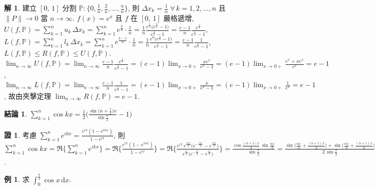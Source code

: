 \documentclass[12pt]{extarticle}
\newcommand{\ds}{\displaystyle}
\theoremstyle{definition}
\newtheorem*{fact}{結論}
\newtheorem*{ex}{例}
\newtheorem*{sol}{解}
\newtheorem*{prf}{證}
\begin{document}
\begin{sol}
  建立 $\ds [0,\,1]$ 分割 $\ds\mathbb{P}: \Big\{0, \frac{1}{n}, \frac{2}{n}, \ldots, \frac{n}{n}\Big\}$, 則 $\ds\Delta x_k = \frac{1}{n}\;\forall\,k=1,2,\ldots,n$ 且 $\ds\|P\|\to 0$ 當 $n\to\infty$. $f(x) = e^x$ 且 $f$ 在 $[0,\,1]$ 嚴格遞增, $\ds U(f,\mathbb{P}) = \sum_{k=1}^n u_k\,\Delta x_k = \sum_{k=1}^n e^{\frac{k}{n}}\cdot\frac{1}{n} = \frac{1}{n}\frac{e^{\frac{1}{n}}\big(e^{\frac{n}{n}} - 1\big)}{e^{\frac{1}{n}} - 1} = \frac{e - 1}{n}\frac{e^{\frac{1}{n}}}{e^{\frac{1}{n}} - 1}$, $\ds L(f,\mathbb{P}) = \sum_{k=1}^n l_k\,\Delta x_k = \sum_{k=1}^n e^{\frac{k - 1}{n}}\cdot\frac{1}{n} = \frac{1}{n}\frac{e^0\big(e^{\frac{n}{n}} - 1\big)}{e^{\frac{1}{n}} - 1} = \frac{e - 1}{n}\frac{1}{e^{\frac{1}{n}} - 1}$, $\ds L(f,\mathbb{P})\leqslant R(f,\mathbb{P})\leqslant U(f, \mathbb{P})$. $\ds\lim_{n\to\infty} U(f,\mathbb{P}) = \lim_{n\to\infty}\frac{e - 1}{n}\frac{e^{\frac{1}{n}}}{e^{\frac{1}{n}} - 1} = (e - 1)\lim_{x\to 0+}\frac{x e^x}{e^x - 1} = (e - 1)\lim_{x\to 0+}\frac{e^x + x e^x}{e^x} = e - 1$, $\ds\lim_{n\to\infty} L(f,\mathbb{P}) = \lim_{n\to\infty}\frac{e - 1}{n}\frac{1}{e^{\frac{1}{n}} - 1} = (e - 1)\lim_{x\to 0+}\frac{x}{e^x - 1} = (e - 1)\lim_{x\to 0+}\frac{1}{e^x} = e - 1$, 故由夾擊定理 $\ds\lim_{n\to\infty} R(f,\mathbb{P}) = e - 1$. 
\end{sol}

\begin{fact}
  $\ds\sum_{k = 1}^n \cos kx = \frac{1}{2}\bigg(\frac{\sin\big(n+\frac{1}{2}\big)x}{\sin\frac{x}{2}}-1\bigg)$
\end{fact}

\begin{prf}
  考慮 $\ds\sum_{k = 1}^{n} e^{ikx} = \frac{e^{ix}(1 - e^{inx})}{1 - e^{ix}}$, 則 $\ds\sum_{k = 1}^{n} \cos kx = \Re\Big\{\sum_{k = 1}^n e^{ikx}\Big\} = \Re\Big\{\frac{e^{ix}(1 - e^{inx})}{1 - e^{ix}}\Big\} = \Re\bigg\{\frac{e^{ix}\,e^{\frac{inx}{2}}\big(e^{-\frac{inx}{2}} - e^{\frac{inx}{2}}\big)}{e^{\frac{ix}{2}}\big(e^{-\frac{ix}{2}} - e^{\frac{ix}{2}}\big)}\bigg\} = \frac{\cos\frac{(n+1)x}{2}\,\sin\frac{nx}{2}}{\sin\frac{x}{2}} = \frac{\sin\big(\frac{nx}{2} + \frac{(n + 1)x}{2}\big) + \sin\big(\frac{nx}{2} + \frac{(n + 1)x}{2}\big)}{2\,\sin\frac{x}{2}} = \frac{\sin\big(n+\frac{1}{2}\big)x - \sin\frac{x}{2}}{2\,\sin\frac{x}{2}} = \frac{1}{2}\bigg(\frac{\sin\big(n+\frac{1}{2}\big)x}{\sin\frac{x}{2}}-1\bigg)$.  
\end{prf}

\begin{ex}
  求 $\ds\int_0^{\frac{\pi}{2}}\cos x\,\text{d}x$. 
\end{ex}
\end{document}
